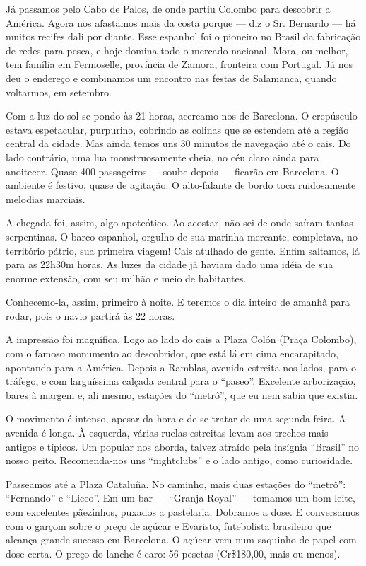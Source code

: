 Já passamos pelo Cabo de Palos, de onde partiu Colombo para descobrir a América. Agora nos afastamos mais da costa porque --- diz o Sr. Bernardo --- há muitos recifes dali por diante. Esse espanhol foi o pioneiro no Brasil da fabricação de redes para pesca, e hoje domina todo o mercado nacional. Mora, ou melhor, tem família em Fermoselle, província de Zamora, fronteira com Portugal. Já nos deu o endereço e combinamos um encontro nas festas de Salamanca, quando voltarmos, em setembro.

Com a luz do sol se pondo às 21 horas, acercamo-nos de Barcelona. O crepúsculo estava espetacular, purpurino, cobrindo as colinas que se estendem até a região central da cidade. Mas ainda temos uns 30 minutos de navegação até o cais. Do lado contrário, uma lua monstruosamente cheia, no céu claro ainda para anoitecer. Quase 400 passageiros --- soube depois --- ficarão em Barcelona. O ambiente é festivo, quase de agitação. O alto-falante de bordo toca ruidosamente melodias marciais.

A chegada foi, assim, algo apoteótico. Ao acostar, não sei de onde saíram tantas serpentinas. O barco espanhol, orgulho de sua marinha mercante, completava, no território pátrio, sua primeira viagem! Cais atulhado de gente. Enfim saltamos, lá para as 22h30m horas. As luzes da cidade já haviam dado uma idéia de sua enorme extensão, com seu milhão e meio de habitantes.

Conhecemo-la, assim, primeiro à noite. E teremos o dia inteiro de amanhã para rodar, pois o navio partirá às 22 horas.

A impressão foi magnífica. Logo ao lado do cais a Plaza Colón (Praça Colombo), com o famoso monumento ao descobridor, que está lá em cima encarapitado, apontando para a América. Depois a Ramblas, avenida estreita nos lados, para o tráfego, e com larguíssima calçada central para o ``paseo''. Excelente arborização, bares à margem e, ali mesmo, estações do ``metrô'', que eu nem sabia que existia.

O movimento é intenso, apesar da hora e de se tratar de uma segunda-feira. A avenida é longa. À esquerda, várias ruelas estreitas levam aos trechos mais antigos e típicos. Um popular nos aborda, talvez atraído pela insígnia ``Brasil'' no nosso peito. Recomenda-nos uns ``nightclubs'' e o lado antigo, como curiosidade.

Passeamos até a Plaza Cataluña. No caminho, mais duas estações do ``metrô'': ``Fernando'' e ``Liceo''. Em um bar --- ``Granja Royal'' --- tomamos um bom leite, com excelentes pãezinhos, puxados a pastelaria. Dobramos a dose. E conversamos com o garçom sobre o preço de açúcar e Evaristo, futebolista brasileiro que alcança grande sucesso em Barcelona. O açúcar vem num saquinho de papel com dose certa. O preço do lanche é caro: 56 pesetas (Cr\$180,00, mais ou menos).

